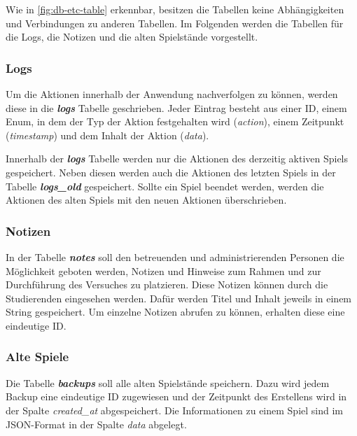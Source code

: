 Wie in \autoref{fig:db-etc-table} erkennbar, besitzen die Tabellen keine Abhängigkeiten und Verbindungen zu anderen Tabellen. Im Folgenden werden die Tabellen für die Logs, die Notizen und die alten Spielstände vorgestellt.

\subsubsection{Logs}
Um die Aktionen innerhalb der Anwendung nachverfolgen zu können, werden diese in die \textbf{\textit{logs}} Tabelle geschrieben. Jeder Eintrag besteht aus einer ID, einem Enum, in dem der Typ der Aktion festgehalten wird (\textit{action}), einem Zeitpunkt (\textit{timestamp}) und dem Inhalt der Aktion (\textit{data}). 

Innerhalb der \textbf{\textit{logs}} Tabelle werden nur die Aktionen des derzeitig aktiven Spiels gespeichert. Neben diesen werden auch die Aktionen des letzten Spiels in der Tabelle \textbf{\textit{logs\_old}} gespeichert. Sollte ein Spiel beendet werden, werden die Aktionen des alten Spiels mit den neuen Aktionen überschrieben.

\subsubsection{Notizen}
In der Tabelle \textbf{\textit{notes}} soll den betreuenden und administrierenden Personen die Möglichkeit geboten werden, Notizen und Hinweise zum Rahmen und zur Durchführung des Versuches zu platzieren. Diese Notizen können durch die Studierenden eingesehen werden. Dafür werden Titel und Inhalt jeweils in einem String gespeichert. Um einzelne Notizen abrufen zu können, erhalten diese eine eindeutige ID.

\subsubsection{Alte Spiele}
Die Tabelle \textbf{\textit{backups}} soll alle alten Spielstände speichern. Dazu wird jedem Backup eine eindeutige ID zugewiesen und der Zeitpunkt des Erstellens wird in der Spalte \textit{created\_at} abgespeichert. Die Informationen zu einem Spiel sind im JSON-Format in der Spalte \textit{data} abgelegt.